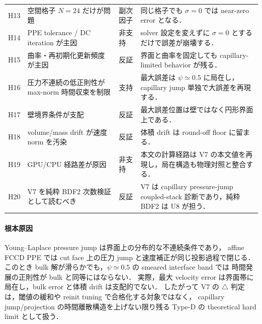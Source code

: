 \begin{table}[htbp]
\begin{tabularx}{\linewidth}{>{\raggedright\arraybackslash}p{9mm}X>{\raggedright\arraybackslash}p{23mm}X}
H13 & 空間格子 $N=24$ だけが問題 & 副次因子 &
同じ格子でも $\sigma=0$ では near-zero error となる．\\
H14 & PPE tolerance / DC iteration が主因 & 非支持 &
solver 設定を変えずに $\sigma=0$ とするだけで誤差が崩壊する．\\
H15 & 曲率・再初期化更新頻度が主因 & 反証 &
界面と曲率を固定しても capillary-limited behavior が残る．\\
H16 & 圧力不連続の低正則性が max-norm 時間収束を制限 & 支持 &
最大誤差は $\psi\simeq0.5$ に局在し，capillary jump 単独で大誤差を再現する．\\
H17 & 壁境界条件が支配 & 反証 &
最大誤差位置は壁ではなく円形界面上である．\\
H18 & volume/mass drift が速度 norm を汚染 & 反証 &
体積 drift は round-off floor に留まる．\\
H19 & GPU/CPU 経路差が原因 & 非支持 &
本文の計算経路は V7 の本文値を再現し，局在構造も物理対照と整合する．\\
H20 & V7 を純粋 BDF2 次数検証として読むべき & 反証 &
V7 は capillary pressure-jump coupled-stack 診断であり，純粋 BDF2 は U8 が担う．\\
\bottomrule
\end{tabularx}
\end{table}

\paragraph{根本原因}

Young--Laplace pressure jump は界面上の分布的な不連続条件であり，
affine FCCD PPE では cut face 上の圧力 jump と速度補正が同じ投影過程で閉じる．
このとき bulk 解が滑らかでも，$\psi\simeq0.5$ の smeared interface band では
時間発展の正則性が bulk と同等にはならない．
実際，最大 velocity error は界面帯に局在し，bulk error と体積 drift は支配的でない．
したがって V7 の $\triangle$ 判定は，閾値の緩和や reinit tuning で合格化する対象ではなく，
capillary jump/projection の時間離散構造を上げない限り残る
Type-D の theoretical hard limit として扱う．
